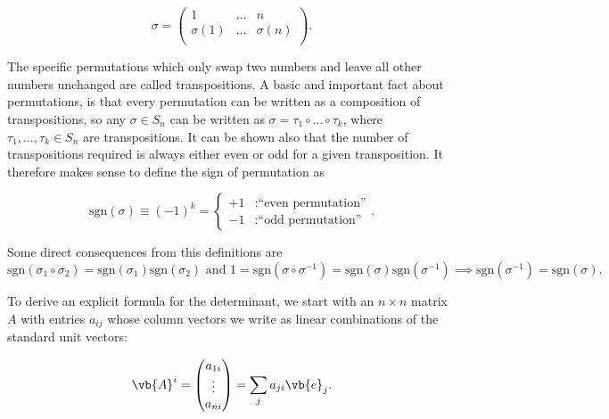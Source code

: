 \documentclass[a4paper,12pt]{report}
\begin{document}
\begin{equation}
    \sigma = \begin{pmatrix}
        1 & \ldots  &  n \\
        \sigma (1) & \ldots  & \sigma (n)  \\
    \end{pmatrix}.
\end{equation}

The specific permutations which only swap two numbers and leave all other numbers unchanged are called transpositions. A basic and important fact about permutations, is that every permutation can be written as a composition of transpositions, so any \(\sigma \in  S_{n} \) can be written as \(\sigma = \tau _{1}  \circ \ldots \circ \tau _{k}  \), where \(\tau _{1}, \ldots , \tau _{k} \in  S_{n}  \) are transpositions. It can be shown also that the number of transpositions required is always either even or odd for a given transposition. It therefore makes sense to define the sign of permutation as 

\begin{equation}
    \text{sgn}(\sigma ) \equiv (-1)^{k} = 
    \begin{cases}
        +1 &: \text{``even permutation''} \\
        -1 &: \text{``odd permutation''}
    \end{cases}.  
\end{equation}

Some direct consequences from this definitions are \(\text{sgn}(\sigma _{1} \circ \sigma _{2}  ) = \text{sgn}(\sigma _{1} ) \text{sgn}(\sigma _{2} ) \text { and } 1 = \text{sgn}(\sigma \circ \sigma ^{-1} ) = \text{sgn}(\sigma )\text{sgn}(\sigma ^{-1} ) \implies \text{sgn}(\sigma ^{-1} ) = \text{sgn}(\sigma ).        \) 

To derive an explicit formula for the determinant, we start with an \(n \times n\) matrix \(A\) with entries \(a_{ij} \) whose column vectors we write as linear combinations of the standard unit vectors: 

\begin{equation}
    \vb{A} ^{i} = \begin{pmatrix}
         a_{1i}  \\
         \vdots  \\
         a_{ni} \\
    \end{pmatrix} = \sum_{j}^{} a_{ji} \vb{e} _{j}.  
\end{equation}
\end{document}
